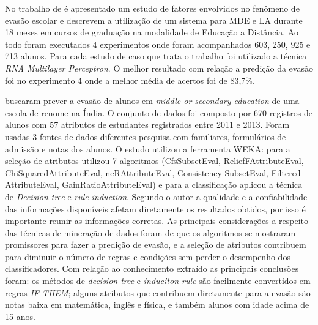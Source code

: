 \documentclass[diss-proposta,nocipinfo]{texufpel}
\begin{document}
No trabalho de \citet{rigo2014aplicaccoes} é apresentado um estudo de fatores envolvidos no fenômeno de evasão escolar e descrevem a utilização de um sistema para MDE e LA durante 18 meses em cursos de graduação na modalidade de Educação a Distância. Ao todo foram executados 4 experimentos onde foram acompanhados 603, 250, 925 e 713 alunos. Para cada estudo de caso que trata o trabalho foi utilizado a técnica \textit{RNA Multilayer Perceptron}. O melhor resultado com relação a predição da evasão foi no experimento 4 onde a melhor média de acertos foi de 83,7\%.

\citet{pradeep2015students} buscaram prever a evasão de alunos em \textit{middle or secondary education} de uma escola de renome na Índia. O conjunto de dados foi composto por 670 registros de alunos com 57 atributos de estudantes registrados entre 2011 e 2013. Foram usadas 3 fontes de dados diferentes pesquisa com familiares, formulários de admissão e notas dos alunos. O estudo utilizou a ferramenta WEKA: para a seleção de atributos utilizou 7 algoritmos (CfsSubsetEval, ReliefFAttributeEval, ChiSquaredAttributeEval, neRAttributeEval, Consistency-SubsetEval, Filtered AttributeEval, GainRatioAttributeEval) e para a classificação aplicou a técnica de \textit{Decision tree} e \textit{rule induction}. Segundo o autor a qualidade e a confiabilidade das informações disponíveis afetam diretamente os resultados obtidos, por isso é importante reunir as informações corretas. As principais considerações a respeito das técnicas de mineração de dados foram de que os algoritmos se mostraram promissores para fazer a predição de evasão, e a seleção de atributos contribuem para diminuir o número de regras e condições sem perder o desempenho dos classificadores. Com relação ao conhecimento extraído as principais conclusões foram: os métodos de \textit{decision tree} e \textit{induciton rule} são facilmente convertidos em regras \textit{IF-THEM}; alguns atributos que contribuem diretamente para a evasão são notas baixa em matemática, inglês e física, e também alunos com idade acima de 15 anos.
\end{document}
